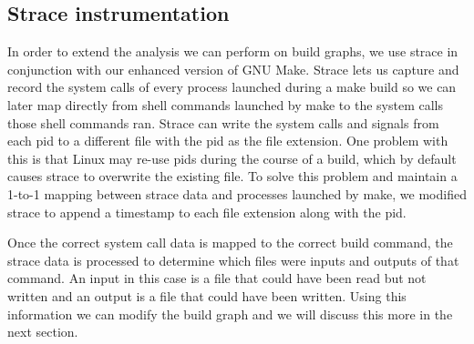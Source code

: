 \documentclass[sigplan,10pt,review,authorversion]{acmart}\settopmatter{printfolios=true,printccs=false,printacmref=false}
\begin{document}

\subsection{Strace instrumentation}
\label{sec:straceinstr}

In order to extend the analysis we can perform on build graphs, we use strace \cite{} in
conjunction with our enhanced version of GNU Make.  Strace lets us capture and record the system
calls of every process launched during a make build so we can later map directly from shell
commands launched by make to the system calls those shell commands ran.  Strace can write the
system calls and signals from each pid to a different file with the pid as the file extension.
One problem with this is that Linux may re-use pids during the course of a build, which by default
causes strace to overwrite the existing file.  To solve this problem and maintain a 1-to-1
mapping between strace data and processes launched by make, we modified strace to append a
timestamp to each file extension along with the pid.

Once the correct system call data is mapped to the correct build command, the strace data is
processed to determine which files were inputs and outputs of that command.  An input in this case
is a file that could have been read but not written and an output is a file that could have been
written.  Using this information we can modify the build graph and we will discuss this more
in the next section.



\end{document}
